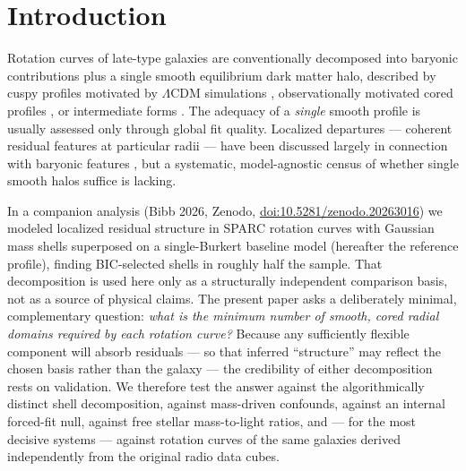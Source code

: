 \documentclass[twocolumn]{aastex701}
\providecommand{\doi}[1]{\href{https://doi.org/#1}{doi:#1}}
\begin{document}

\section{Introduction} \label{sec:intro}

Rotation curves of late-type galaxies are conventionally decomposed into
baryonic contributions plus a single smooth equilibrium dark matter halo,
described by cuspy profiles motivated by $\Lambda$CDM simulations
\citep[NFW;][]{Navarro1996}, observationally motivated cored profiles
\citep[Burkert;][]{Burkert1995}, or intermediate forms
\citep[Einasto;][]{Einasto1965}. The adequacy of a \emph{single} smooth
profile is usually assessed only through global fit quality. Localized
departures --- coherent residual features at particular radii --- have been
discussed largely in connection with baryonic features
\citep[``Renzo's rule'';][]{Sancisi2004}, but a systematic, model-agnostic
census of whether single smooth halos suffice is lacking.

In a companion analysis (Bibb 2026, Zenodo, \doi{10.5281/zenodo.20263016}) we
modeled localized residual structure in SPARC \citep{Lelli2016} rotation
curves with Gaussian mass shells superposed on a single-Burkert baseline model
(hereafter the reference profile), finding
BIC-selected shells in roughly half the sample. That decomposition is used
here only as a structurally independent comparison basis, not as a source of
physical claims. The present paper asks a deliberately minimal,
complementary question: \emph{what is the minimum number of smooth,
cored radial domains required by each rotation curve?} Because
any sufficiently flexible component will absorb residuals --- so that
inferred ``structure'' may reflect the chosen basis rather than the galaxy
--- the credibility of either decomposition rests on validation. We therefore
test the answer against the algorithmically distinct shell decomposition,
against mass-driven confounds, against an internal forced-fit null, against
free stellar mass-to-light ratios, and --- for the most decisive systems ---
against rotation curves of the same galaxies derived
independently from the original radio data cubes.
\end{document}

